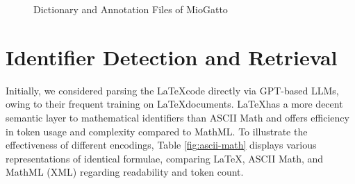 \begin{figure}[htpb]
  \centering
  \quad 
  \caption[LaTeXML Preprocessing]{Dictionary and Annotation Files of MioGatto}\label{fig:miogatto-data}
\end{figure}

\section{Identifier Detection and Retrieval}\label{sec:pre-processing}

Initially, we considered parsing the \LaTeX \space code directly via GPT-based LLMs, owing to their frequent training on \LaTeX \space documents. \LaTeX \space has a more decent semantic layer to mathematical identifiers than ASCII Math and offers efficiency in token usage and complexity compared to MathML. To illustrate the effectiveness of different encodings, Table \ref{fig:ascii-math} displays various representations of identical formulae, comparing \LaTeX, ASCII Math, and MathML (XML) regarding readability and token count.


